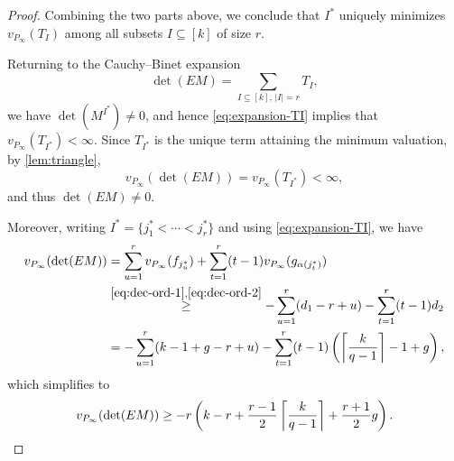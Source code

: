 \documentclass[10pt,a4paper]{amsart}
\begin{document}
\begin{proof}
Combining the two parts above, we conclude that $I^*$ uniquely minimizes $v_{P_\infty}(T_I)$ among all subsets $I\subseteq [k]$ of size $r$.

Returning to the Cauchy--Binet expansion
\[
\det(EM)=\sum_{I\subseteq [k],\, |I|=r} T_I,
\]
we have $\det(M^{I^*})\neq 0$, and hence \eqref{eq:expansion-TI} implies that
$v_{P_\infty}(T_{I^*}) < \infty$.
Since $T_{I^*}$ is the unique term attaining the minimum valuation, by \cref{lem:triangle},
\[
v_{P_\infty}(\det(EM)) = v_{P_\infty}(T_{I^*}) < \infty,
\]
and thus $\det(EM)\neq 0$.

Moreover, writing $I^*=\{j_1^*<\cdots<j_r^*\}$ and using \eqref{eq:expansion-TI}, we have
\begin{align*}
v_{P_\infty}(\det(EM))
&=
\sum_{u=1}^r v_{P_\infty}(f_{j_u^*})
+
\sum_{t=1}^r (t-1)v_{P_\infty}(g_{\alpha(j_t^*)})\\
&\stackrel{\eqref{eq:dec-ord-1},\eqref{eq:dec-ord-2}}{\ge}
-\sum_{u=1}^r(d_1-r+u)-\sum_{t=1}^r (t-1)d_2\\
&=-\sum_{u=1}^r(k-1+g-r+u)-\sum_{t=1}^r (t-1)\left(\left\lceil\frac{k}{q-1}\right\rceil-1+g\right),
\end{align*}
which simplifies to
\[
v_{P_\infty}(\det(EM))\geq -r\left(
k-r+\frac{r-1}{2}\left\lceil \frac{k}{q-1}\right\rceil+\frac{r+1}{2}g 
\right).\qedhere
\]
\end{proof}
\end{document}
